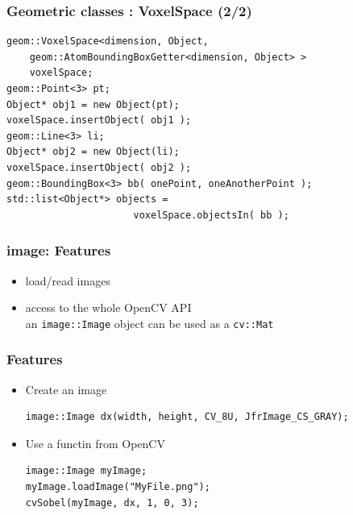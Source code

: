 \documentclass[compress]{beamer}
\begin{document}
\begin{frame}[fragile]
  \frametitle{Geometric classes : VoxelSpace (2/2)}

  \begin{lstlisting}
geom::VoxelSpace<dimension, Object,
    geom::AtomBoundingBoxGetter<dimension, Object> >
    voxelSpace;
geom::Point<3> pt;
Object* obj1 = new Object(pt);
voxelSpace.insertObject( obj1 );
geom::Line<3> li;
Object* obj2 = new Object(li);
voxelSpace.insertObject( obj2 );
geom::BoundingBox<3> bb( onePoint, oneAnotherPoint );
std::list<Object*> objects =
                      voxelSpace.objectsIn( bb );
  \end{lstlisting}

\end{frame}


\begin{frame}
  \frametitle{image: Features}
  \begin{itemize}
   \item<1-> load/read images
   \item<2-> access to the whole OpenCV API\\
an \texttt{image::Image} object can be used as a \texttt{cv::Mat}
  \end{itemize}
\end{frame}


\begin{frame}[fragile]
  \frametitle{Features}
  \begin{itemize}
   \item<1-> Create an image
\begin{lstlisting}
image::Image dx(width, height, CV_8U, JfrImage_CS_GRAY);
\end{lstlisting}
    \item<2-> Use a functin from OpenCV
\begin{lstlisting}
image::Image myImage;
myImage.loadImage("MyFile.png");
cvSobel(myImage, dx, 1, 0, 3);
\end{lstlisting}
  \end{itemize}

\end{frame}

\end{document}
